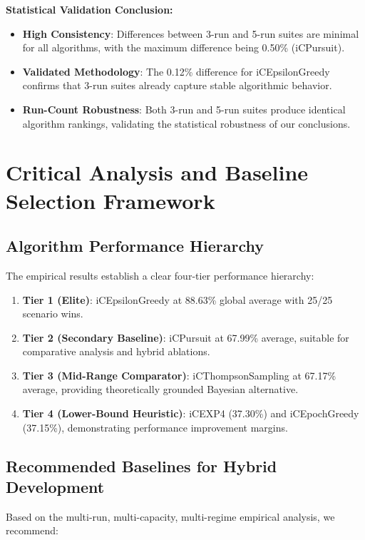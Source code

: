 \documentclass[12pt,a4paper]{article}
\newcommand{\success}[1]{\textcolor{successcolor}{\textbf{#1}}}
\begin{document}
\textbf{Statistical Validation Conclusion:}

\begin{itemize}
\item \success{High Consistency}: Differences between 3-run and 5-run suites are minimal for all algorithms, with the maximum difference being 0.50\% (iCPursuit).
\item \success{Validated Methodology}: The 0.12\% difference for iCEpsilonGreedy confirms that 3-run suites already capture stable algorithmic behavior.
\item \success{Run-Count Robustness}: Both 3-run and 5-run suites produce identical algorithm rankings, validating the statistical robustness of our conclusions.
\end{itemize}

\section{Critical Analysis and Baseline Selection Framework}

\subsection{Algorithm Performance Hierarchy}

The empirical results establish a clear four-tier performance hierarchy:

\begin{enumerate}
\item \textbf{Tier 1 (Elite)}: iCEpsilonGreedy at 88.63\% global average with 25/25 scenario wins.
\item \textbf{Tier 2 (Secondary Baseline)}: iCPursuit at 67.99\% average, suitable for comparative analysis and hybrid ablations.
\item \textbf{Tier 3 (Mid-Range Comparator)}: iCThompsonSampling at 67.17\% average, providing theoretically grounded Bayesian alternative.
\item \textbf{Tier 4 (Lower-Bound Heuristic)}: iCEXP4 (37.30\%) and iCEpochGreedy (37.15\%), demonstrating performance improvement margins.
\end{enumerate}

\subsection{Recommended Baselines for Hybrid Development}

Based on the multi-run, multi-capacity, multi-regime empirical analysis, we recommend:
\end{document}
